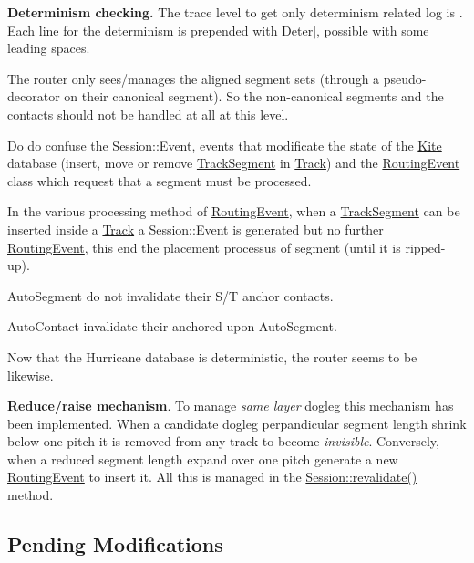 \begin{DoxyItemize}
\item {\bfseries Determinism checking.} The trace level to get only determinism related log is {}. Each line for the determinism is prepended with \textquotesingle{}Deter$\vert$\textquotesingle{}, possible with some leading spaces.
\item The router only sees/manages the aligned segment sets (through a pseudo-\/ decorator on their canonical segment). So the non-\/canonical segments and the contacts should not be handled at all at this level.
\item Do do confuse the Session\+::\+Event, events that modificate the state of the \hyperlink{namespaceKite}{Kite} database (insert, move or remove \hyperlink{classKite_1_1TrackSegment}{Track\+Segment} in \hyperlink{classKite_1_1Track}{Track}) and the \hyperlink{classKite_1_1RoutingEvent}{Routing\+Event} class which request that a segment must be processed.
\item In the various processing method of \hyperlink{classKite_1_1RoutingEvent}{Routing\+Event}, when a \hyperlink{classKite_1_1TrackSegment}{Track\+Segment} can be inserted inside a \hyperlink{classKite_1_1Track}{Track} a Session\+::\+Event is generated but no further \hyperlink{classKite_1_1RoutingEvent}{Routing\+Event}, this end the placement processus of segment (until it is ripped-\/up).
\item Auto\+Segment do not invalidate their S/T anchor contacts.
\item Auto\+Contact invalidate their anchored upon Auto\+Segment.
\item Now that the Hurricane database is deterministic, the router seems to be likewise.
\item {\bfseries Reduce/raise mechanism}. To manage {\itshape same layer} dogleg this mechanism has been implemented. When a candidate dogleg perpandicular segment length shrink below one pitch it is removed from any track to become {\itshape invisible}. Conversely, when a reduced segment length expand over one pitch generate a new \hyperlink{classKite_1_1RoutingEvent}{Routing\+Event} to insert it. All this is managed in the \hyperlink{classKite_1_1Session_a5bd93abe1416952ace15a98dbeeed124}{Session\+::revalidate()} method.
\end{DoxyItemize}\hypertarget{pageNotes_secPendingModifications}{}\subsection{Pending Modifications}\label{pageNotes_secPendingModifications}

